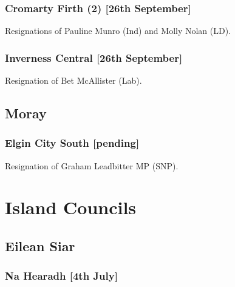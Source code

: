 \documentclass[a4paper,openany]{book}
\begin{document}
\begin{resultsiii}
\subsubsection*{Cromarty Firth (2) \hspace*{\fill}\nolinebreak[1]%
	\enspace\hspace*{\fill}
	[26th September]}


Resignations of Pauline Munro (Ind) and Molly Nolan (LD).

\subsubsection*{Inverness Central \hspace*{\fill}\nolinebreak[1]%
	\enspace\hspace*{\fill}
	[26th September]}


Resignation of Bet McAllister (Lab).

\subsection*{Moray}

\subsubsection*{Elgin City South \hspace*{\fill}\nolinebreak[1]%
	\enspace\hspace*{\fill}
	[pending]}


Resignation of Graham Leadbitter MP (SNP).

\section{Island Councils}

\subsection*{Eilean Siar}

\subsubsection*{Na Hearadh \hspace*{\fill}\nolinebreak[1]%
	\enspace\hspace*{\fill}
	[4th July]}


\end{resultsiii}
\end{document}
